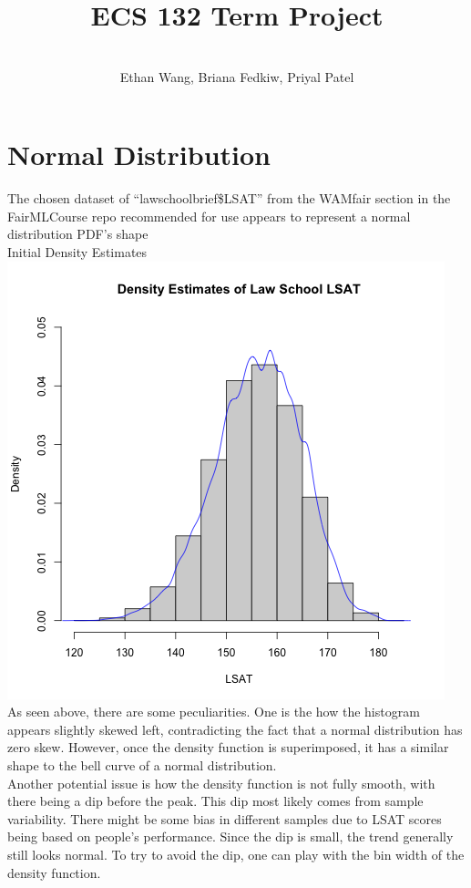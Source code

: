 \documentclass[12pt, letterpaper]{article}
\title{ECS 132 Term Project}
\author{\\ Ethan Wang, Briana Fedkiw, Priyal Patel}
\date{}
\begin{document}
\maketitle

\newpage
\noindent
\section*{Normal Distribution}
\normalsize
The chosen dataset of ``lawschoolbrief\$LSAT'' from the WAMfair section in the FairMLCourse repo recommended for use appears to represent a normal distribution PDF's shape \\
Initial Density Estimates\\
\includegraphics[scale=0.85]{Lawschool_LSAT_Density}\\
As seen above, there are some peculiarities. One is the how the histogram appears slightly skewed left, contradicting the fact that a normal distribution has zero skew. However, once the density function is superimposed, it has a similar shape to the bell curve of a normal distribution. \\
Another potential issue is how the density function is not fully smooth, with there being a dip before the peak. This dip most likely comes from sample variability. There might be some bias in different samples due to LSAT scores being based on people's performance. Since the dip is small, the trend generally still looks normal. To try to avoid the dip, one can play with the bin width of the density function. \\
\end{document}
